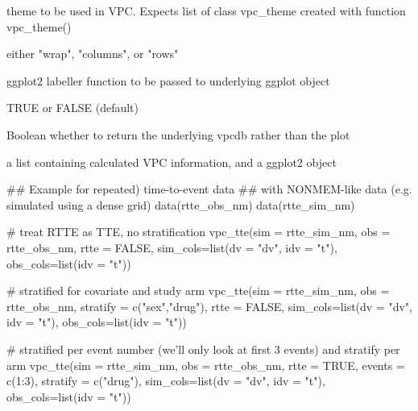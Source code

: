 \documentclass[letterpaper]{book}
\begin{document}
\begin{Arguments}
\begin{ldescription}
\item[\code{vpc\_theme}] theme to be used in VPC. Expects list of class vpc\_theme created with function vpc\_theme()

\item[\code{facet}] either "wrap", "columns", or "rows"

\item[\code{labeller}] ggplot2 labeller function to be passed to underlying ggplot object

\item[\code{verbose}] TRUE or FALSE (default)

\item[\code{vpcdb}] Boolean whether to return the underlying vpcdb rather than the plot
\end{ldescription}
\end{Arguments}
%
\begin{Value}
a list containing calculated VPC information, and a ggplot2 object
\end{Value}
%
\begin{SeeAlso}\relax
{}
\end{SeeAlso}
%
\begin{Examples}
\begin{ExampleCode}
## Example for repeated) time-to-event data
## with NONMEM-like data (e.g. simulated using a dense grid)
data(rtte_obs_nm)
data(rtte_sim_nm)

# treat RTTE as TTE, no stratification
vpc_tte(sim = rtte_sim_nm,
        obs = rtte_obs_nm,
        rtte = FALSE,
        sim_cols=list(dv = "dv", idv = "t"), obs_cols=list(idv = "t"))

# stratified for covariate and study arm
vpc_tte(sim = rtte_sim_nm,
        obs = rtte_obs_nm,
        stratify = c("sex","drug"),
        rtte = FALSE,
        sim_cols=list(dv = "dv", idv = "t"), obs_cols=list(idv = "t"))

# stratified per event number (we'll only look at first 3 events) and stratify per arm
vpc_tte(sim = rtte_sim_nm,
        obs = rtte_obs_nm,
        rtte = TRUE, events = c(1:3),
        stratify = c("drug"),
        sim_cols=list(dv = "dv", idv = "t"), obs_cols=list(idv = "t"))
\end{ExampleCode}
\end{Examples}
\printindex{}
\end{document}
